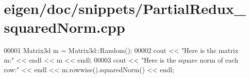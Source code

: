 \hypertarget{eigen_2doc_2snippets_2_partial_redux__squared_norm_8cpp_source}{}\section{eigen/doc/snippets/\+Partial\+Redux\+\_\+squared\+Norm.cpp}
\label{eigen_2doc_2snippets_2_partial_redux__squared_norm_8cpp_source}

\begin{DoxyCode}
00001 Matrix3d m = Matrix3d::Random();
00002 cout << \textcolor{stringliteral}{"Here is the matrix m:"} << endl << m << endl;
00003 cout << \textcolor{stringliteral}{"Here is the square norm of each row:"} << endl << m.rowwise().squaredNorm() << endl;
\end{DoxyCode}
